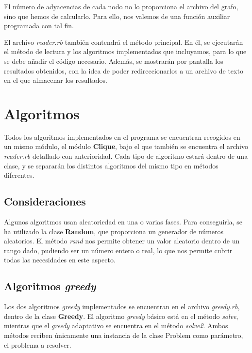 El número de adyacencias de cada nodo no lo proporciona el archivo del grafo,
sino que hemos de calcularlo. Para ello, nos valemos de una función auxiliar
programada con tal fin.

El archivo \textit{reader.rb} también contendrá el método principal. En él, se
ejecutarán el método de lectura y los algoritmos implementados que incluyamos,
para lo que se debe añadir el código necesario. Además, se mostrarán por pantalla
los resultados obtenidos, con la idea de poder redireccionarlos a un archivo de
texto en el que almacenar los resultados.


\section{Algoritmos}

Todos los algoritmos implementados en el programa se encuentran recogidos en
un mismo módulo, el módulo \textbf{Clique}, bajo el que también se encuentra el
archivo \textit{reader.rb} detallado con anterioridad. Cada tipo de algoritmo
estará dentro de una clase, y se separarán los distintos algoritmos del mismo
tipo en métodos diferentes.

\subsection{Consideraciones}

Algunos algoritmos usan aleatoriedad en una o varias fases. Para conseguirla, se
ha utilizado la clase \textbf{Random}, que proporciona un generador de números
aleatorios. El método \textit{rand} nos permite obtener un valor aleatorio
dentro de un rango dado, pudiendo ser un número entero o real, lo que nos permite
cubrir todas las necesidades en este aspecto.


\subsection{Algoritmos \textit{greedy}}

Los dos algoritmos \textit{greedy} implementados se encuentran en el archivo
\textit{greedy.rb}, dentro de la clase \textbf{Greedy}. El algoritmo \textit{greedy}
básico está en el método \textit{solve}, mientras que el \textit{greedy} adaptativo
se encuentra en el método \textit{solve2}. Ambos métodos reciben únicamente una
instancia de la clase Problem como parámetro, el problema a resolver.

